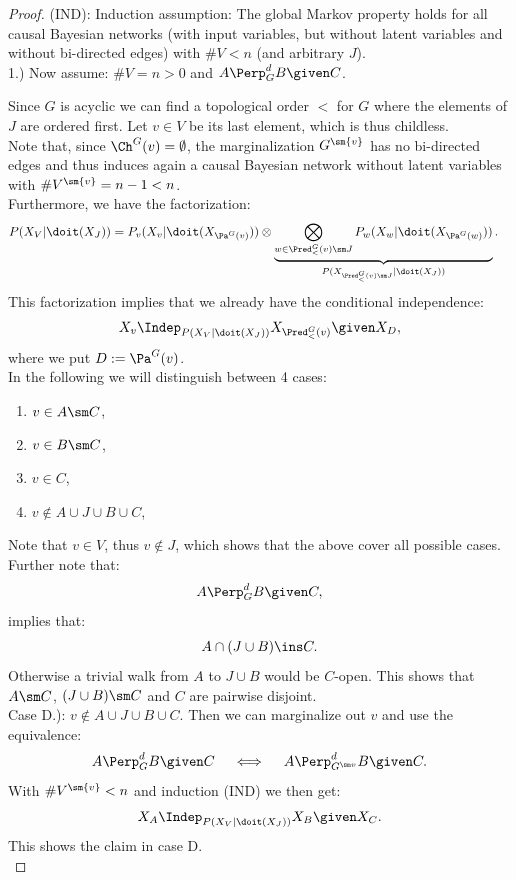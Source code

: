 \begin{Thm}
\begin{proof}
(IND): Induction assumption: 
The global Markov property holds for all causal Bayesian networks 
(with input variables, but without latent variables and without bi-directed edges) 
with $\#V < n$ (and arbitrary $J$).\\

1.) Now assume: $\#V =n>0$ and $A \Perp^d_G B \given C$.

Since $G$ is acyclic we can find a topological order $<$ for $G$ where the elements of $J$ are ordered first.  
Let $v \in V$ be its last element, which is thus  childless.  \\
Note that, since $\Ch^G(v) = \emptyset$, the marginalization $G^{\sm \{v\}}$ has no bi-directed edges and thus induces again 
a causal Bayesian network without latent variables with $\#V^{\sm \{v\}}=n-1 <n$.\\
Furthermore, we have the factorization:
\begin{align*} P(X_V|\doit(X_J)) &= P_v(X_v|\doit(X_{\Pa^G(v)})) \otimes 
    \underbrace{\bigotimes_{w \in \Pred^G_<(v) \sm J} P_w(X_w|\doit(X_{\Pa^G(w)}))}_{P(X_{\Pred_<^G(v) \sm J}|\doit(X_J))}.
\end{align*}
This factorization implies that we already have the conditional independence:
\begin{align*}
    X_v \Indep_{P(X_V|\doit(X_J)) } X_{\Pred^G_<(v)} \given X_D,     \label{eq:pred}
\end{align*}
where we put $D:=\Pa^{G}(v)$.\\

In the following we will distinguish between 4 cases: 
\begin{enumerate}[label = \Alph*.)]
    \item $v \in A \sm C$,
    \item $v \in B \sm C$,
    \item $v \in C$,
    \item $ v \notin A \cup J \cup B \cup C$,
\end{enumerate}
Note that $v \in V$, thus $v \notin J$, which shows that the above cover all possible cases.\\
Further note that:
\[A \Perp^d_G  B \given C,\] 
implies that:
\[ A \cap ( J \cup B) \ins C.  \]
Otherwise a trivial walk from $A$ to $J \cup B$ would be $C$-open. 
This shows that $A\sm C$, $(J \cup B) \sm C$ and $C$ are pairwise disjoint.\\


Case D.):  $v \notin A \cup J \cup B \cup C$. Then we can marginalize out $v$ and use the equivalence: 
\[A \Perp^d_{G}  B \given C\quad \iff \quad A \Perp^d_{G^{\sm v}}  B \given C.\]
With $\#V^{\sm \{v\}}<n$ and induction (IND) we then get:
\[X_A \Indep_{P(X_V|\doit(X_J))} X_B \given X_C.\]
This shows the claim in case D.\\


\end{proof}
\end{Thm}

